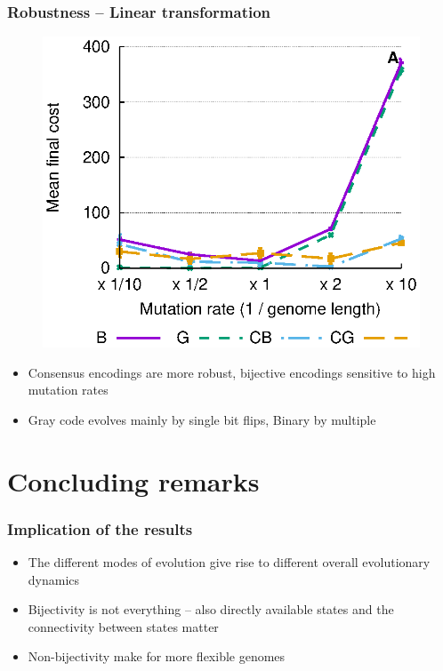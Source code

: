 \documentclass{beamer}
\theoremstyle{plain}
\theoremstyle{definition}
\begin{document}
\begin{frame}
   \frametitle{Robustness -- Linear transformation}
   \vspace{3cm}
   \begin{figure}
      \includegraphics[trim=0 4.2cm 0 0,scale=.7]{pres_mutrates_a}
   \end{figure}
   \vspace{-5cm}
   \begin{itemize}
      \item Consensus encodings are more robust, bijective encodings sensitive
            to high mutation rates
      \item Gray code evolves mainly by single bit flips, Binary by multiple
   \end{itemize}
\end{frame}
\section{Concluding remarks}
\begin{frame}
   \frametitle{Implication of the results}
   \begin{itemize}
      \item The different modes of evolution give rise to different overall
         evolutionary dynamics
      \item Bijectivity is not everything -- also directly available states and
      the connectivity between states matter
      \item Non-bijectivity make for more flexible genomes
   \end{itemize}
\end{frame}
\end{document}
